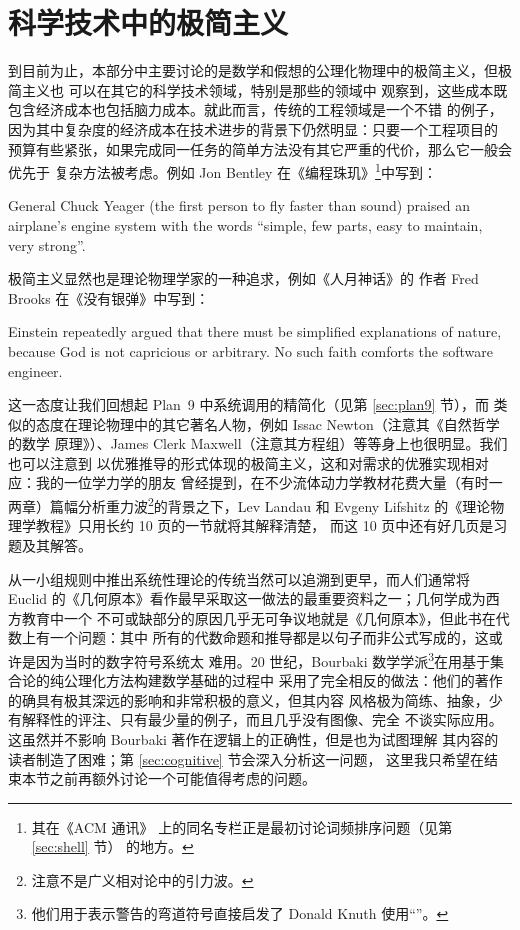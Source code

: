 \section{科学技术中的极简主义}\label{sec:science}

到目前为止，本部分中主要讨论的是数学和假想的公理化物理中的极简主义，但极简主义也
可以在其它的科学技术领域，特别是那些的领域中
观察到，这些成本既包含经济成本也包括脑力成本。就此而言，传统的工程领域是一个不错
的例子，因为其中复杂度的经济成本在技术进步的背景下仍然明显：只要一个工程项目的
预算有些紧张，如果完成同一任务的简单方法没有其它严重的代价，那么它一般会优先于
复杂方法被考虑。例如 Jon Bentley 在《编程珠玑》\footnote{其在《ACM 通讯》
上的同名专栏正是最初讨论词频排序问题（见第 \ref{sec:shell} 节）
的地方。}中写到：
\begin{quoting}
	General Chuck Yeager (the first person to fly faster than
	sound) praised an airplane's engine system with the words
	``simple, few parts, easy to maintain, very strong''.
\end{quoting}

极简主义显然也是理论物理学家的一种追求，例如《人月神话》的
作者 Fred Brooks 在《没有银弹》中写到：
\begin{quoting}
	Einstein repeatedly argued that there must be simplified
	explanations of nature, because God is not capricious or
	arbitrary.  No such faith comforts the software engineer.
\end{quoting}
这一态度让我们回想起 Plan~9 中系统调用的精简化（见第 \ref{sec:plan9} 节），而
类似的态度在理论物理中的其它著名人物，例如 Issac Newton（注意其《自然哲学的数学
原理》）、James Clerk Maxwell（注意其方程组）等等身上也很明显。我们也可以注意到
以优雅推导的形式体现的极简主义，这和对需求的优雅实现相对应：我的一位学力学的朋友
曾经提到，在不少流体动力学教材花费大量（有时一两章）篇幅分析重力波\footnote%
{注意不是广义相对论中的引力波。}的背景之下，Lev Landau 和 Evgeny Lifshitz
的《理论物理学教程》只用长约 10 页的一节就将其解释清楚，
而这 10 页中还有好几页是习题及其解答。

从一小组规则中推出系统性理论的传统当然可以追溯到更早，而人们通常将 Euclid
的《几何原本》看作最早采取这一做法的最重要资料之一；几何学成为西方教育中一个
不可或缺部分的原因几乎无可争议地就是《几何原本》，但此书在代数上有一个问题：其中
所有的代数命题和推导都是以句子而非公式写成的，这或许是因为当时的数字符号系统太
难用。20 世纪，Bourbaki 数学学派\footnote{他们用于表示警告的弯道符号直接启发了
Donald Knuth 使用“\textdbend”。}在用基于集合论的纯公理化方法构建数学基础的过程中
采用了完全相反的做法：他们的著作的确具有极其深远的影响和非常积极的意义，但其内容
风格极为简练、抽象，少有解释性的评注、只有最少量的例子，而且几乎没有图像、完全
不谈实际应用。这虽然并不影响 Bourbaki 著作在逻辑上的正确性，但是也为试图理解
其内容的读者制造了困难；第 \ref{sec:cognitive} 节会深入分析这一问题，
这里我只希望在结束本节之前再额外讨论一个可能值得考虑的问题。

